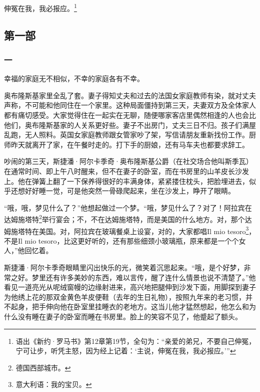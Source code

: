 \clearpage

\begin{center}
    伸冤在我，我必报应。\footnote{语出《新约·罗马书》第12章第19节，全句为：“亲爱的弟兄，不要自己伸冤，宁可让步，听凭主怒，因为经上记着：‘主说，伸冤在我，我必报应。’”}
\end{center}

\subsection*{第一部}



\subsubsection*{一}

\par 幸福的家庭无不相似，不幸的家庭各有不幸。
\par 奥布隆斯基家里全乱了套。妻子得知丈夫和过去的法国女家庭教师有染，就对丈夫声称，不可能和他同住在一个家里。这种局面僵持到第三天，夫妻双方及全体家人都有痛切感受。大家觉得住在一起实在无聊，随便哪家客店里偶然相逢的人也会比他们，奥布隆斯基家的人关系更好些。妻子不出房门，丈夫三日不归。孩子们满屋乱跑，无人照料。英国女家庭教师跟女管家吵了架，写信请朋友重新找份工作。厨师昨天就离开了家，在午餐时走的。打下手的厨娘，还有马车夫也都要求辞工。
\par 吵闹的第三天，斯捷潘·阿尔卡季奇·奥布隆斯基公爵（在社交场合他叫斯季瓦）在通常时间、即上午八时醒来，但不在妻子的卧室，而在书房里的山羊皮长沙发上。他在弹簧上翻了一下保养得很好的丰满身体，紧紧搂住枕头，把脸埋进去，似乎还想好好睡一觉，可是他突然一骨碌爬起来，坐在沙发上，睁开了眼睛。
\par “哦，哦，梦见什么了？”他想起做过一个梦。“哦，梦见什么了？对了！阿拉宾在达姆施塔特\footnote{德国西部城市。}举行宴会；不，不在达姆施塔特，而是美国的什么地方。对，那个达姆施塔特在美国。对，阿拉宾在玻璃餐桌上设宴，对的，大家都唱Il mio tesoro\footnote{意大利语：我的宝贝。}，不是Il mio tesoro，比这更好听的，还有那些细颈小玻璃瓶，原来都是一个个女人，”他回忆着。
\par 斯捷潘·阿尔卡季奇眼睛里闪出快乐的光，微笑着沉思起来。“哦，是个好梦，非常之好。梦里还有许多美妙的东西，难以言传，醒了连什么情景也说不清楚了。”他看见一道亮光从呢绒窗幔的边缘射进来，高兴地把腿伸到沙发下面，用脚探到妻子为他绣上花的那双金黄色羊皮便鞋（去年的生日礼物），按照九年来的老习惯，并不起身，把手伸向他在卧室里挂睡衣的老地方。这当儿他才猛然想起，他怎么和为什么没有睡在妻子的卧室而睡在书房里。脸上的笑容不见了，他蹙起了额头。
